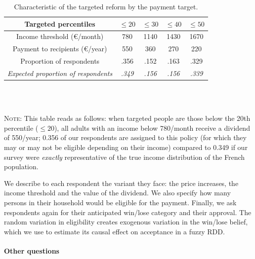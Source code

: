 \documentclass[12pt]{article} %
\begin{document}

\begin{table}[H]
\caption{\label{tab:Compensation-amount-by}Characteristic of the targeted
reform by the payment target.}
\centering%
\begin{tabular}{ccccc}
\hline 
\hline 
Targeted percentiles & $\leq20$ & $\leq30$ & $\leq40$ & $\leq50$\tabularnewline
\hline 
Income threshold (\euro{}/month) & 780 & 1140 & 1430 & 1670\tabularnewline
Payment to recipients (\euro{}/year) & 550 & 360 & 270 & 220\tabularnewline
Proportion of respondents & .356 & .152 & .163 & .329\tabularnewline
\emph{Expected proportion of respondents} & \emph{.349} & \emph{.156} & \emph{.156} & \emph{.339}\tabularnewline
\hline 
\hline 
\end{tabular}
\\ \quad \\ {\footnotesize \parbox[t]{.94\textwidth}{\linespread{1.2}\selectfont \textsc{Note:}  This table reads as follows: when targeted people are those below the 20th percentile ($\leq 20$), all adults with an income below 780\euros{}/month receive a dividend of 550\euros{}/year; 0.356 of our respondents are assigned to this policy (for which they may or may not be eligible depending on their income) compared to 0.349 if our survey were \textit{exactly} representative of the true income distribution of the French population. }}
\end{table}


We describe to each respondent the variant they face: the price increases, the income threshold and the value of the dividend. We also specify how many persons in their household would be eligible for the payment. Finally, we ask respondents again for their anticipated win/lose category and their approval. The random variation in eligibility creates exogenous variation in the win/lose belief, which we use to estimate its causal effect on acceptance in a fuzzy RDD.



\paragraph{Other questions}
\end{document}
